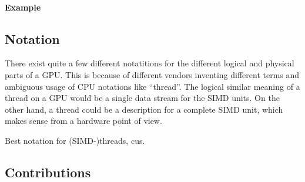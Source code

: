 \paragraph{Example}

\subsection{Notation}
\label{sub:notation}
There exist quite a few different notatitions for the different logical and physical parts of a GPU. This is because of different vendors inventing different terms and ambiguous usage of CPU notations like \enquote{thread}. The logical similar meaning of a thread on a GPU would be a single data stream for the SIMD units. On the other hand, a thread could be a description for a complete SIMD unit, which makes sense from a hardware point of view.

Best notation for (SIMD-)threads, \glspl{cu}.

\subsection{Contributions}
\label{sub:contributions}
